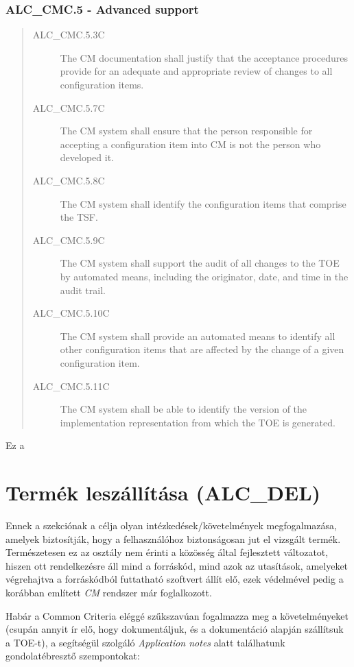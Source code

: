 \subsubsection{ALC\_CMC.5 - Advanced support}
\begin{quote}
    \begin{description}
        \item[ALC\_CMC.5.3C]{The CM documentation shall justify that the acceptance procedures
            provide for an adequate and appropriate review of changes to all configuration items.}
        \item[ALC\_CMC.5.7C]{The CM system shall ensure that the person responsible for accepting a
            configuration item into CM is not the person who developed it.}
        \item[ALC\_CMC.5.8C]{The CM system shall identify the configuration items that comprise the
            TSF.}
        \item[ALC\_CMC.5.9C]{The CM system shall support the audit of all changes to the TOE by
            automated means, including the originator, date, and time in the audit trail.}
        \item[ALC\_CMC.5.10C]{The CM system shall provide an automated means to identify all other
            configuration items that are affected by the change of a given configuration item.}
        \item[ALC\_CMC.5.11C]{The CM system shall be able to identify the version of the
            implementation representation from which the TOE is generated.}
    \end{description}
\end{quote}

Ez a

\pagebreak[2]
\section{Termék leszállítása (ALC\_DEL)}

Ennek a szekciónak a célja olyan intézkedések/követelmények megfogalmazása, amelyek biztosítják,
hogy a felhasználóhoz biztonságosan jut el vizsgált termék. Természetesen ez az osztály nem érinti a
közösség által fejlesztett változatot, hiszen ott rendelkezésre áll mind a forráskód, mind azok az
utasítások, amelyeket végrehajtva a forráskódból futtatható szoftvert állít elő, ezek védelmével
pedig a korábban említett \emph{CM} rendszer már foglalkozott.

Habár a Common Criteria eléggé szűkszavúan fogalmazza meg a követelményeket (csupán annyit ír elő,
hogy dokumentáljuk, és a dokumentáció alapján szállítsuk a TOE-t), a segítségül szolgáló
\emph{Application notes} alatt találhatunk gondolatébresztő szempontokat:

